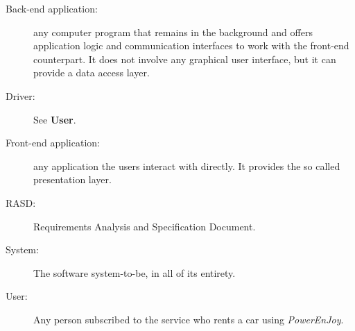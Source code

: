 \begin{description}
\item[Back-end application:] any computer program that remains in the background and offers application logic and communication interfaces to work with the front-end counterpart. It does not involve any graphical user interface, but it can provide a data access layer.
\item[Driver:] See \textbf{User}.
\item[Front-end application:] any application the users interact with directly. It provides the so called presentation layer.
\item[RASD:] Requirements Analysis and Specification Document.
\item[System:] The software system-to-be, in all of its entirety.
\item[User:] Any person subscribed to the service who rents a car using \hbox{\emph{PowerEnJoy}}.
\end{description}

